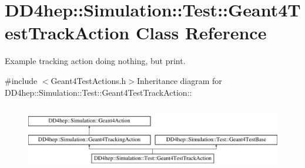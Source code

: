 \hypertarget{class_d_d4hep_1_1_simulation_1_1_test_1_1_geant4_test_track_action}{
\section{DD4hep::Simulation::Test::Geant4TestTrackAction Class Reference}
\label{class_d_d4hep_1_1_simulation_1_1_test_1_1_geant4_test_track_action}
}


Example tracking action doing nothing, but print.  


{\ttfamily \#include $<$Geant4TestActions.h$>$}Inheritance diagram for DD4hep::Simulation::Test::Geant4TestTrackAction::\begin{figure}[H]
\begin{center}
\leavevmode
\includegraphics[height=2.84746cm]{class_d_d4hep_1_1_simulation_1_1_test_1_1_geant4_test_track_action}
\end{center}
\end{figure}
